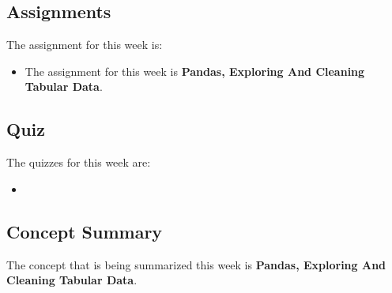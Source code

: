 \subsection{Assignments}

The assignment for this week is:

\begin{itemize}
    \item The assignment for this week is \textbf{Pandas, Exploring And Cleaning Tabular Data}. 
\end{itemize}

\subsection{Quiz}

The quizzes for this week are:

\begin{itemize}
    \item {} \textbullet {} 
\end{itemize}

\subsection{Concept Summary}

The concept that is being summarized this week is \textbf{Pandas, Exploring And Cleaning Tabular Data}.

